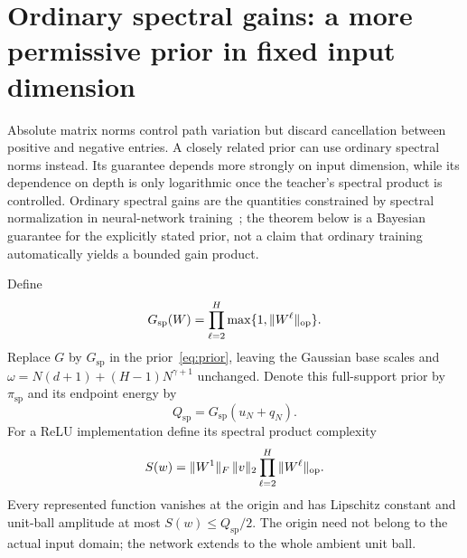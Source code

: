\section{Ordinary spectral gains: a more permissive prior in fixed input dimension}
\label{sec:ordinary-spectral-variant}
Absolute matrix norms control path variation but discard cancellation between positive and negative entries. A closely related prior can use ordinary spectral norms instead. Its guarantee depends more strongly on input dimension, while its dependence on depth is only logarithmic once the teacher's spectral product is controlled. Ordinary spectral gains are the quantities constrained by spectral normalization in neural-network training~\cite{spectral-normalization}; the theorem below is a Bayesian guarantee for the explicitly stated prior, not a claim that ordinary training automatically yields a bounded gain product.

Define
\[
 G_{\mathrm{sp}}(W)=\prod_{\ell=2}^H\max\{1,\|W^\ell\|_{\mathrm{op}}\}.
\]
Replace $G$ by $G_{\mathrm{sp}}$ in the prior~\eqref{eq:prior}, leaving the Gaussian base scales and $\omega=N(d+1)+(H-1)N^{\gamma+1}$ unchanged. Denote this full-support prior by $\pi_{\mathrm{sp}}$ and its endpoint energy by
\[
 Q_{\mathrm{sp}}=G_{\mathrm{sp}}(u_N+q_N).
\]
For a ReLU implementation define its spectral product complexity
\begin{equation}
 S(w)=\|W^1\|_F\,\|v\|_2\prod_{\ell=2}^H\|W^\ell\|_{\mathrm{op}}.
 \label{eq:spectral-product}
\end{equation}
Every represented function vanishes at the origin and has Lipschitz constant and unit-ball amplitude at most $S(w)\le Q_{\mathrm{sp}}/2$. The origin need not belong to the actual input domain; the network extends to the whole ambient unit ball.

